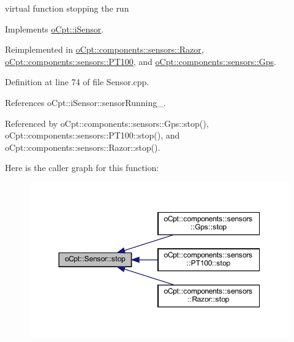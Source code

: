 virtual function stopping the run 

Implements \hyperlink{classo_cpt_1_1i_sensor_aa85c22a8c8f7c2445379e1f82835f8dc}{o\+Cpt\+::i\+Sensor}.



Reimplemented in \hyperlink{classo_cpt_1_1components_1_1sensors_1_1_razor_a807441c137892ee3c1b612c284893fa1}{o\+Cpt\+::components\+::sensors\+::\+Razor}, \hyperlink{classo_cpt_1_1components_1_1sensors_1_1_p_t100_a6d80e18a58cf4e1b9b6ce82b441209e2}{o\+Cpt\+::components\+::sensors\+::\+P\+T100}, and \hyperlink{classo_cpt_1_1components_1_1sensors_1_1_gps_a9206c32fa91311740ae920c01eed6094}{o\+Cpt\+::components\+::sensors\+::\+Gps}.



Definition at line 74 of file Sensor.\+cpp.



References o\+Cpt\+::i\+Sensor\+::sensor\+Running\+\_\+.



Referenced by o\+Cpt\+::components\+::sensors\+::\+Gps\+::stop(), o\+Cpt\+::components\+::sensors\+::\+P\+T100\+::stop(), and o\+Cpt\+::components\+::sensors\+::\+Razor\+::stop().

Here is the caller graph for this function\+:
\nopagebreak
\begin{figure}[H]
\begin{center}
\leavevmode
\includegraphics[width=350pt]{classo_cpt_1_1_sensor_a44ad78c2c091ca9cf72295293f8c5b74_icgraph}
\end{center}
\end{figure}
\hypertarget{classo_cpt_1_1_sensor_ab4b0dedb06f11bcf2368852035beb2b2}{}\label{classo_cpt_1_1_sensor_ab4b0dedb06f11bcf2368852035beb2b2} 
